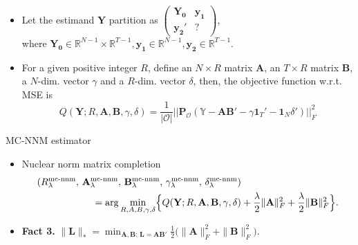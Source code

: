 \documentclass[xcolor=svgnames,aspectratio=169]{beamer}
\newcommand{\R}{\mathbb{R}}
\begin{document}
\begin{frame}
    \begin{itemize}
        \item Let the estimand $\mathbf{Y}$ partition as $
        \begin{pmatrix} \mathbf{Y_0} & \mathbf{y_1} \\ \mathbf{y_2}' & ? \end{pmatrix}$, \\ where $\mathbf{Y_0}\in\R^{N-1}\times \R^{T-1}, \mathbf{y_1}\in\R^{N-1}, \mathbf{y_2}\in\R^{T-1}$.
        \item For a given positive integer $R$, define an $N\times R$ matrix $\mathbf{A}$, an $T\times R$ matrix $\mathbf{B}$, a $N$-dim. vector $\gamma$ and a $R$-dim. vector $\delta$, then, the objective function w.r.t. MSE is
        \[
        Q(\mathbf{Y}; R, \mathbf{A}, \mathbf{B}, \gamma, \delta)=\frac{1}{|\mathcal{O} |} ||\mathbf{P_{\mathcal{O} }}({\mathbb{Y}-\mathbf{AB'}-\gamma}\mathbf{1}_T'-\mathbf{1}_N\delta')||_F^2
        \]
    \end{itemize}
\end{frame}

\begin{frame}{MC-NNM estimator}
    \begin{itemize}
        \item Nuclear norm matrix completion
        \begin{align*}
        (R_\lambda^{\mathrm{mc\text{-}nnm}},\,
         \mathbf{A}_\lambda^{\mathrm{mc\text{-}nnm}},\,
         \mathbf{B}_\lambda^{\mathrm{mc\text{-}nnm}},\,
         \gamma_\lambda^{\mathrm{mc\text{-}nnm}},\,
         \delta_\lambda^{\mathrm{mc\text{-}nnm}})& \\
        = \arg\min_{R,A,B,\gamma,\delta}
           \Bigl\{Q(\mathbf{Y};R,\mathbf{A},\mathbf{B},\gamma,\delta)
        &+\frac{\lambda}{2}\|\mathbf{A}\|_F^2
           +\frac{\lambda}{2}\|\mathbf{B}\|_F^2\Bigr\}.
        \end{align*}
        \item \textbf{Fact 3.} $\|\mathbf{L}\|_*
        = \min_{\mathbf{A},\mathbf{B}:\,\mathbf{L}=\mathbf{A}\mathbf{B}'}
          \frac{1}{2}\bigl(\|\mathbf{A}\|_F^2 + \|\mathbf{B}\|_F^2\bigr).$
  \end{itemize}
\end{frame}
\end{document}
